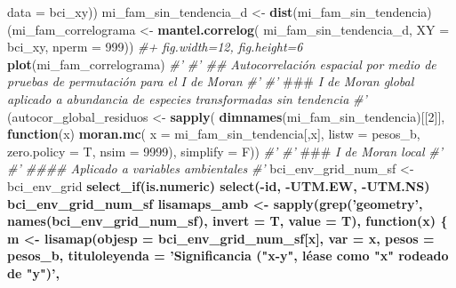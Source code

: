 \documentclass[11pt,]{article}
\newenvironment{Shaded}{\begin{snugshade}}{\end{snugshade}}
\newcommand{\KeywordTok}[1]{\textcolor[rgb]{0.13,0.29,0.53}{\textbf{#1}}}
\newcommand{\DataTypeTok}[1]{\textcolor[rgb]{0.13,0.29,0.53}{#1}}
\newcommand{\DecValTok}[1]{\textcolor[rgb]{0.00,0.00,0.81}{#1}}
\newcommand{\StringTok}[1]{\textcolor[rgb]{0.31,0.60,0.02}{#1}}
\newcommand{\CommentTok}[1]{\textcolor[rgb]{0.56,0.35,0.01}{\textit{#1}}}
\newcommand{\ControlFlowTok}[1]{\textcolor[rgb]{0.13,0.29,0.53}{\textbf{#1}}}
\newcommand{\OperatorTok}[1]{\textcolor[rgb]{0.81,0.36,0.00}{\textbf{#1}}}
\newcommand{\AlertTok}[1]{\textcolor[rgb]{0.94,0.16,0.16}{#1}}
\newcommand{\NormalTok}[1]{#1}
\begin{document}
\begin{Shaded}
\begin{Highlighting}[]
{{{{{{{{{{     \DataTypeTok{data =}\NormalTok{ bci_xy))}
\NormalTok{mi_fam_sin_tendencia_d <-}\StringTok{ }\KeywordTok{dist}\NormalTok{(mi_fam_sin_tendencia)}
\NormalTok{(mi_fam_correlograma <-}\StringTok{ }\KeywordTok{mantel.correlog}\NormalTok{(}
\NormalTok{  mi_fam_sin_tendencia_d,}
  \DataTypeTok{XY =}\NormalTok{ bci_xy,}
  \DataTypeTok{nperm =} \DecValTok{999}\NormalTok{))}
\CommentTok{#+ fig.width=12, fig.height=6}
\KeywordTok{plot}\NormalTok{(mi_fam_correlograma)}
\CommentTok{#' }
\CommentTok{#' ## Autocorrelación espacial por medio de pruebas de permutación para el I de Moran}
\CommentTok{#' }
\CommentTok{#' }\AlertTok{###}\CommentTok{ I de Moran global aplicado a abundancia de especies transformadas sin tendencia}
\CommentTok{#' }
\NormalTok{(autocor_global_residuos <-}\StringTok{ }\KeywordTok{sapply}\NormalTok{(}
  \KeywordTok{dimnames}\NormalTok{(mi_fam_sin_tendencia)[[}\DecValTok{2}\NormalTok{]],}
  \ControlFlowTok{function}\NormalTok{(x)}
    \KeywordTok{moran.mc}\NormalTok{(}
      \DataTypeTok{x =}\NormalTok{ mi_fam_sin_tendencia[,x],}
      \DataTypeTok{listw =}\NormalTok{ pesos_b,}
      \DataTypeTok{zero.policy =}\NormalTok{ T,}
      \DataTypeTok{nsim =} \DecValTok{9999}\NormalTok{),}
  \DataTypeTok{simplify =}\NormalTok{ F))}
\CommentTok{#' }
\CommentTok{#' }\AlertTok{###}\CommentTok{ I de Moran local}
\CommentTok{#' }
\CommentTok{#' #### Aplicado a variables ambientales}
\CommentTok{#' }
\NormalTok{bci_env_grid_num_sf <-}\StringTok{ }\NormalTok{bci_env_grid }\OperatorTok{%
\StringTok{  }\KeywordTok{select_if}\NormalTok{(is.numeric) }\OperatorTok{%
\StringTok{  }\KeywordTok{select}\NormalTok{(}\OperatorTok{-}\NormalTok{id, }\OperatorTok{-}\NormalTok{UTM.EW, }\OperatorTok{-}\NormalTok{UTM.NS)}
\NormalTok{bci_env_grid_num_sf }\OperatorTok{%
\NormalTok{lisamaps_amb <-}\StringTok{ }\KeywordTok{sapply}\NormalTok{(}\KeywordTok{grep}\NormalTok{(}\StringTok{'geometry'}\NormalTok{, }\KeywordTok{names}\NormalTok{(bci_env_grid_num_sf), }\DataTypeTok{invert =}\NormalTok{ T, }\DataTypeTok{value =}\NormalTok{ T),}
                       \ControlFlowTok{function}\NormalTok{(x) \{}
\NormalTok{                         m <-}\StringTok{ }\KeywordTok{lisamap}\NormalTok{(}\DataTypeTok{objesp =}\NormalTok{ bci_env_grid_num_sf[x],}
                                      \DataTypeTok{var =}\NormalTok{ x,}
                                      \DataTypeTok{pesos =}\NormalTok{ pesos_b,}
                                      \DataTypeTok{tituloleyenda =} \StringTok{'Significancia ("x-y", léase como "x" rodeado de "y")'}\NormalTok{,}
}}}}}}}}}}}}}
\end{Highlighting}
\end{Shaded}
\end{document}
